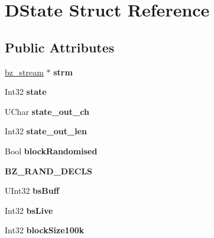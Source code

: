 \hypertarget{struct_d_state}{}\section{D\+State Struct Reference}
\label{struct_d_state}
\subsection*{Public Attributes}
\begin{DoxyCompactItemize}
\item 
\hyperlink{structbz__stream}{bz\+\_\+stream} $\ast$ {\bfseries strm}\hypertarget{struct_d_state_a083c2502fe1db2e0903cccb4de54efd1}{}\label{struct_d_state_a083c2502fe1db2e0903cccb4de54efd1}

\item 
Int32 {\bfseries state}\hypertarget{struct_d_state_a70a740d52793a3933adfc46aeb3f41cb}{}\label{struct_d_state_a70a740d52793a3933adfc46aeb3f41cb}

\item 
U\+Char {\bfseries state\+\_\+out\+\_\+ch}\hypertarget{struct_d_state_aae326a8636a1e915486845b618582251}{}\label{struct_d_state_aae326a8636a1e915486845b618582251}

\item 
Int32 {\bfseries state\+\_\+out\+\_\+len}\hypertarget{struct_d_state_a692445b35df22bc814c264fbe3ed7fda}{}\label{struct_d_state_a692445b35df22bc814c264fbe3ed7fda}

\item 
Bool {\bfseries block\+Randomised}\hypertarget{struct_d_state_af18fc51a50bcba9c8badb3a432b124c9}{}\label{struct_d_state_af18fc51a50bcba9c8badb3a432b124c9}

\item 
{\bfseries B\+Z\+\_\+\+R\+A\+N\+D\+\_\+\+D\+E\+C\+LS}\hypertarget{struct_d_state_a8c81979baebe9aed6d761d121dbb9066}{}\label{struct_d_state_a8c81979baebe9aed6d761d121dbb9066}

\item 
U\+Int32 {\bfseries bs\+Buff}\hypertarget{struct_d_state_ac8a8f1e3f3db538611317d24562ba0d8}{}\label{struct_d_state_ac8a8f1e3f3db538611317d24562ba0d8}

\item 
Int32 {\bfseries bs\+Live}\hypertarget{struct_d_state_ac366e057d6ff7173a2d2308d78e37cf7}{}\label{struct_d_state_ac366e057d6ff7173a2d2308d78e37cf7}

\item 
Int32 {\bfseries block\+Size100k}\hypertarget{struct_d_state_ad0c76b25a2fdfb322db831658bbc41a7}{}\label{struct_d_state_ad0c76b25a2fdfb322db831658bbc41a7}


\end{DoxyCompactItemize}

